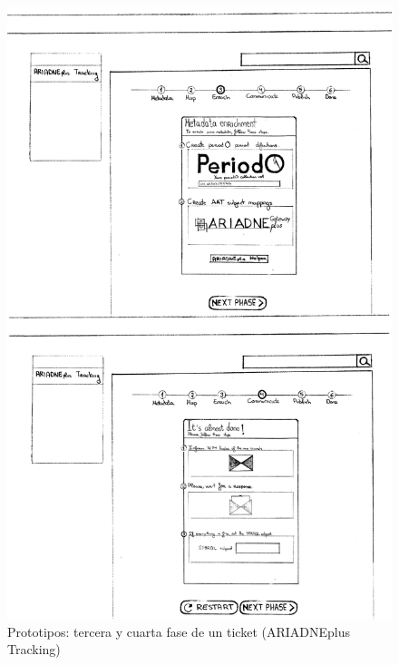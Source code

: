\documentclass[
]{article}
\begin{document}
\begin{figure}
\hypertarget{phase-3-4-prototipe}{%
\centering
\includegraphics{../_static/images/phase-3-4-prototipe.png}
\caption{Prototipos: tercera y cuarta fase de un ticket (ARIADNEplus
Tracking)}\label{phase-3-4-prototipe}
}
\end{figure}
\end{document}
